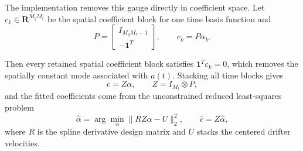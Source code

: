 \documentclass{article}
\begin{document}
 The implementation removes this gauge directly in
 coefficient space. Let $c_k \in \mathbf{R}^{M_q M_r}$ be the
 spatial coefficient block for one time basis function and
\[
 P = \begin{bmatrix}
 I_{M_q M_r - 1} \\
 -\mathbf{1}^T
 \end{bmatrix},
 \qquad
 c_k = P \alpha_k.
\]

 Then every retained spatial coefficient block satisfies
 $\mathbf{1}^T c_k = 0$, which removes the spatially constant
 mode associated with $a(t)$. Stacking all time blocks gives
 \[
 c = Z \alpha, \qquad Z = I_{M_t} \otimes P,
 \]
 and the fitted coefficients come from the unconstrained
 reduced least-squares problem
 \[
 \hat{\alpha} = \arg\min_{\alpha} \|R Z \alpha - U\|_2^2,
 \qquad
 \hat{c} = Z \hat{\alpha},
 \]
 where $R$ is the spline derivative design matrix and $U$
 stacks the centered drifter velocities.
\end{document}
